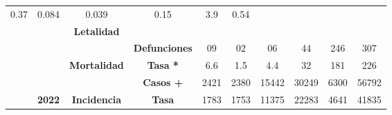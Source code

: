 \begin{tabular}{lccc|cccccc|}
		\multicolumn{1}{c|}{\cellcolor[HTML]{E2EFDA}0.37} &
		\multicolumn{1}{c|}{\cellcolor[HTML]{E2EFDA}0.084} &
		\multicolumn{1}{c|}{\cellcolor[HTML]{E2EFDA}0.039} &
		\multicolumn{1}{c|}{\cellcolor[HTML]{E2EFDA}0.15} &
		\multicolumn{1}{c|}{\cellcolor[HTML]{E2EFDA}3.9} &
		\cellcolor[HTML]{E2EFDA}0.54 \\ \cline{4-10} 
		\multicolumn{1}{l|}{} &
		\multicolumn{1}{c|}{\cellcolor[HTML]{E2EFDA}} &
		\multicolumn{1}{c|}{\multirow{-2}{*}{\cellcolor[HTML]{E2EFDA}\textbf{Letalidad}}} &
		\cellcolor[HTML]{E2EFDA} &
		\multicolumn{1}{c|}{\cellcolor[HTML]{E2EFDA}} &
		\multicolumn{1}{c|}{\cellcolor[HTML]{E2EFDA}} &
		\multicolumn{1}{c|}{\cellcolor[HTML]{E2EFDA}} &
		\multicolumn{1}{c|}{\cellcolor[HTML]{E2EFDA}} &
		\multicolumn{1}{c|}{\cellcolor[HTML]{E2EFDA}} &
		\cellcolor[HTML]{E2EFDA} \\ \cline{3-3}
		\multicolumn{1}{l|}{} &
		\multicolumn{1}{c|}{\cellcolor[HTML]{E2EFDA}} &
		\multicolumn{1}{c|}{\cellcolor[HTML]{E2EFDA}} &
		\multirow{-2}{*}{\cellcolor[HTML]{E2EFDA}\textbf{Defunciones}} &
		\multicolumn{1}{c|}{\multirow{-2}{*}{\cellcolor[HTML]{E2EFDA}09}} &
		\multicolumn{1}{c|}{\multirow{-2}{*}{\cellcolor[HTML]{E2EFDA}02}} &
		\multicolumn{1}{c|}{\multirow{-2}{*}{\cellcolor[HTML]{E2EFDA}06}} &
		\multicolumn{1}{c|}{\multirow{-2}{*}{\cellcolor[HTML]{E2EFDA}44}} &
		\multicolumn{1}{c|}{\multirow{-2}{*}{\cellcolor[HTML]{E2EFDA}246}} &
		\multirow{-2}{*}{\cellcolor[HTML]{E2EFDA}307} \\ \cline{4-10} 
		\multicolumn{1}{l|}{} &
		\multicolumn{1}{c|}{\cellcolor[HTML]{E2EFDA}} &
		\multicolumn{1}{c|}{\multirow{-2}{*}{\cellcolor[HTML]{E2EFDA}\textbf{Mortalidad}}} &
		\cellcolor[HTML]{E2EFDA}\textbf{Tasa *} &
		\multicolumn{1}{c|}{\cellcolor[HTML]{E2EFDA}6.6} &
		\multicolumn{1}{c|}{\cellcolor[HTML]{E2EFDA}1.5} &
		\multicolumn{1}{c|}{\cellcolor[HTML]{E2EFDA}4.4} &
		\multicolumn{1}{c|}{\cellcolor[HTML]{E2EFDA}32} &
		\multicolumn{1}{c|}{\cellcolor[HTML]{E2EFDA}181} &
		\cellcolor[HTML]{E2EFDA}226 \\ \cline{3-10} 
		\multicolumn{1}{l|}{} &
		\multicolumn{1}{c|}{\cellcolor[HTML]{E2EFDA}} &     
		\multicolumn{1}{c|}{\cellcolor[HTML]{E2EFDA}} &
		\cellcolor[HTML]{E2EFDA}\textbf{Casos +} &
		\multicolumn{1}{c|}{\cellcolor[HTML]{E2EFDA}2421} &
		\multicolumn{1}{c|}{\cellcolor[HTML]{E2EFDA}2380} &
		\multicolumn{1}{c|}{\cellcolor[HTML]{E2EFDA}15442} &
		\multicolumn{1}{c|}{\cellcolor[HTML]{E2EFDA}30249} &
		\multicolumn{1}{c|}{\cellcolor[HTML]{E2EFDA}6300} &
		\cellcolor[HTML]{E2EFDA}56792 \\ \cline{4-10} 
		\multicolumn{1}{l|}{} &
		\multicolumn{1}{c|}{\multirow{-6}{*}{\cellcolor[HTML]{E2EFDA}\textbf{2022}}} &
		\multicolumn{1}{c|}{\multirow{-2}{*}{\cellcolor[HTML]{E2EFDA}\textbf{Incidencia}}} &
		\cellcolor[HTML]{E2EFDA}\textbf{Tasa} &
		\multicolumn{1}{c|}{\cellcolor[HTML]{E2EFDA}1783} &
		\multicolumn{1}{c|}{\cellcolor[HTML]{E2EFDA}1753} &
		\multicolumn{1}{c|}{\cellcolor[HTML]{E2EFDA}11375} &
		\multicolumn{1}{c|}{\cellcolor[HTML]{E2EFDA}22283} &
		\multicolumn{1}{c|}{\cellcolor[HTML]{E2EFDA}4641} &
		\cellcolor[HTML]{E2EFDA}41835\\ \cline{2-10} 	
	\end{tabular}